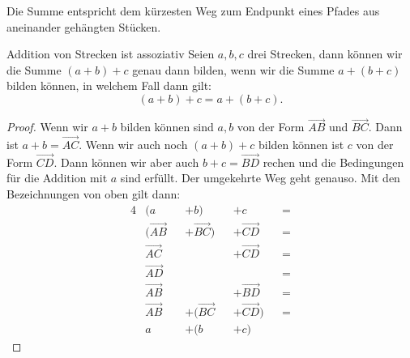 \documentclass[a4paper]{amsart}
\theoremstyle{definition}
\begin{document}
Die Summe entspricht dem kürzesten Weg zum Endpunkt eines Pfades aus aneinander gehängten Stücken.

\begin{Satz}{Addition von Strecken ist assoziativ}
   Seien $a, b, c$ drei Strecken, dann können wir die Summe $(a+b)+c$ genau dann bilden, wenn wir die Summe $a+(b+c)$ bilden können, in welchem Fall dann gilt:
   \begin{equation}
      (a+b)+c = a+(b+c).
   \end{equation}
\end{Satz}
\begin{proof}
   Wenn wir $a+b$ bilden können sind $a, b$ von der Form $\overrightarrow{AB}$ und $\overrightarrow{BC}$. Dann ist $a + b = \overrightarrow{AC}$. Wenn wir auch noch $(a+b)+c$ bilden können ist $c$ von der Form $\overrightarrow{CD}$. Dann können wir aber auch $b + c = \overrightarrow{BD}$ rechen und die Bedingungen für die Addition mit $a$ sind erfüllt. Der umgekehrte Weg geht genauso.
   Mit den Bezeichnungen von oben gilt dann:
   \begin{alignat}{4}
      &(a&&+b)&&+c &&= \\
      &(\overrightarrow{AB} &&+ \overrightarrow{BC}) &&+ \overrightarrow{CD} &&=\\
      &\overrightarrow{AC} && &&+ \overrightarrow{CD} &&=\\
      &\overrightarrow{AD} && && &&=\\
      &\overrightarrow{AB} && &&+ \overrightarrow{BD} &&=\\
      &\overrightarrow{AB} &&+ (\overrightarrow{BC} &&+ \overrightarrow{CD}) &&=\\
      &a&&+(b&&+c)
   \end{alignat}
\end{proof}

\end{document}
